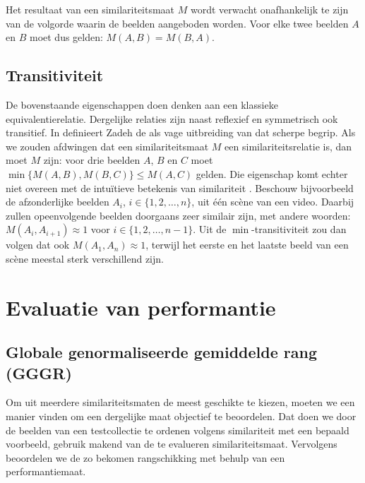 Het resultaat van een similariteitsmaat $M$ wordt verwacht onafhankelijk te zijn van de 
volgorde waarin de beelden aangeboden worden. Voor elke twee beelden $A$ en $B$ moet dus gelden:
$M(A,B)=M(B,A)$.

\subsection{Transitiviteit}

De bovenstaande eigenschappen doen denken aan een klassieke equivalentierelatie. Dergelijke
relaties zijn naast reflexief en symmetrisch ook transitief. In 
\cite{zadeh:similarity_relations_and_fuzzy_orderings} definieert Zadeh
de  als vage uitbreiding van dat scherpe begrip. Als we zouden
afdwingen dat een similariteitsmaat $M$ een similariteitsrelatie is, dan moet $M$ 
 zijn: voor drie beelden $A$, $B$ en $C$ moet 
$\min\{M(A,B),M(B,C)\} \le M(A,C)$ gelden. Die
eigenschap komt echter niet overeen met de intu\"itieve betekenis van similariteit
\cite{de_cock:on_unsuitable_relations_for_approx_equal, de_cock:why_fuzzy_relations_do_not_resolve_pointcare_paradox}. 
Beschouw bijvoorbeeld de afzonderlijke beelden $A_i$, $i \in \{1,2,\ldots,n\}$, uit \'e\'en sc\`ene van een video. 
Daarbij zullen opeenvolgende beelden doorgaans zeer similair zijn, met andere woorden: 
$M(A_i,A_{i+1}) \approx 1$ voor $i \in \{1,2,\ldots,n-1\}$. Uit de $\min$-transitiviteit
zou dan volgen dat ook $M(A_1,A_n) \approx 1$, terwijl het eerste en het laatste beeld
van een sc\`ene meestal sterk verschillend zijn.   

\section{Evaluatie van performantie}

\subsection{Globale genormaliseerde gemiddelde rang (GGGR)}

Om uit meerdere similariteitsmaten de meest geschikte te kiezen, 
moeten we een manier vinden om een dergelijke maat objectief te beoordelen. 
Dat doen we door de beelden van een testcollectie te ordenen volgens similariteit
met een bepaald voorbeeld, gebruik makend van de te evalueren similariteitsmaat.
Vervolgens beoordelen we de zo bekomen rangschikking met behulp van een performantiemaat.

